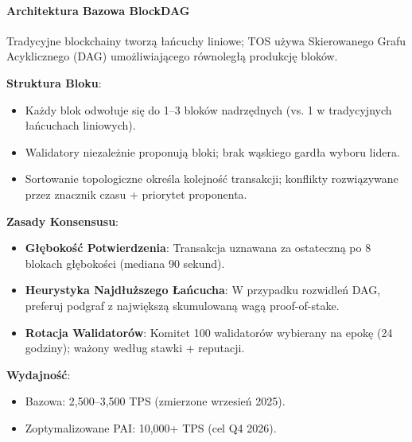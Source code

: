 \documentclass[11pt]{article}
\begin{document}
\paragraph{Architektura Bazowa BlockDAG}
Tradycyjne blockchainy tworzą łańcuchy liniowe; TOS używa Skierowanego Grafu Acyklicznego (DAG) umożliwiającego równoległą produkcję bloków.

\textbf{Struktura Bloku}:
\begin{itemize}[noitemsep]
  \item Każdy blok odwołuje się do 1--3 bloków nadrzędnych (vs. 1 w tradycyjnych łańcuchach liniowych).
  \item Walidatory niezależnie proponują bloki; brak wąskiego gardła wyboru lidera.
  \item Sortowanie topologiczne określa kolejność transakcji; konflikty rozwiązywane przez znacznik czasu + priorytet proponenta.
\end{itemize}

\textbf{Zasady Konsensusu}:
\begin{itemize}[noitemsep]
  \item \textbf{Głębokość Potwierdzenia}: Transakcja uznawana za ostateczną po 8 blokach głębokości (mediana 90 sekund).
  \item \textbf{Heurystyka Najdłuższego Łańcucha}: W przypadku rozwidleń DAG, preferuj podgraf z największą skumulowaną wagą proof-of-stake.
  \item \textbf{Rotacja Walidatorów}: Komitet 100 walidatorów wybierany na epokę (24 godziny); ważony według stawki + reputacji.
\end{itemize}

\textbf{Wydajność}:
\begin{itemize}[noitemsep]
  \item Bazowa: 2,500--3,500 TPS (zmierzone wrzesień 2025).
  \item Zoptymalizowane PAI: 10,000+ TPS (cel Q4 2026).
\end{itemize}
\end{document}
